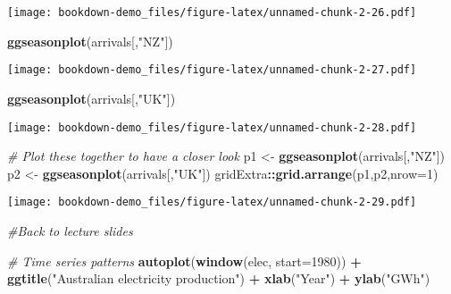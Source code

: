 \documentclass[]{book}
\newenvironment{Shaded}{\begin{snugshade}}{\end{snugshade}}
\newcommand{\CommentTok}[1]{\textcolor[rgb]{0.56,0.35,0.01}{\textit{#1}}}
\newcommand{\DataTypeTok}[1]{\textcolor[rgb]{0.13,0.29,0.53}{#1}}
\newcommand{\DecValTok}[1]{\textcolor[rgb]{0.00,0.00,0.81}{#1}}
\newcommand{\KeywordTok}[1]{\textcolor[rgb]{0.13,0.29,0.53}{\textbf{#1}}}
\newcommand{\NormalTok}[1]{#1}
\newcommand{\OperatorTok}[1]{\textcolor[rgb]{0.81,0.36,0.00}{\textbf{#1}}}
\newcommand{\StringTok}[1]{\textcolor[rgb]{0.31,0.60,0.02}{#1}}
\begin{document}
\texttt{[image: bookdown-demo\_files/figure-latex/unnamed-chunk-2-26.pdf]}

\begin{Shaded}
\begin{Highlighting}[]
  \KeywordTok{ggseasonplot}\NormalTok{(arrivals[,}\StringTok{"NZ"}\NormalTok{])}
\end{Highlighting}
\end{Shaded}

\texttt{[image: bookdown-demo\_files/figure-latex/unnamed-chunk-2-27.pdf]}

\begin{Shaded}
\begin{Highlighting}[]
  \KeywordTok{ggseasonplot}\NormalTok{(arrivals[,}\StringTok{"UK"}\NormalTok{])}
\end{Highlighting}
\end{Shaded}

\texttt{[image: bookdown-demo\_files/figure-latex/unnamed-chunk-2-28.pdf]}

\begin{Shaded}
\begin{Highlighting}[]
  \CommentTok{# Plot these together to have a closer look}
\NormalTok{  p1 <-}\StringTok{ }\KeywordTok{ggseasonplot}\NormalTok{(arrivals[,}\StringTok{"NZ"}\NormalTok{])}
\NormalTok{  p2 <-}\StringTok{ }\KeywordTok{ggseasonplot}\NormalTok{(arrivals[,}\StringTok{"UK"}\NormalTok{])}
\NormalTok{  gridExtra}\OperatorTok{::}\KeywordTok{grid.arrange}\NormalTok{(p1,p2,}\DataTypeTok{nrow=}\DecValTok{1}\NormalTok{)}
\end{Highlighting}
\end{Shaded}

\texttt{[image: bookdown-demo\_files/figure-latex/unnamed-chunk-2-29.pdf]}

\begin{Shaded}
\begin{Highlighting}[]
\CommentTok{#Back to lecture slides}

  \CommentTok{# Time series patterns}
  \KeywordTok{autoplot}\NormalTok{(}\KeywordTok{window}\NormalTok{(elec, }\DataTypeTok{start=}\DecValTok{1980}\NormalTok{)) }\OperatorTok{+}
\StringTok{    }\KeywordTok{ggtitle}\NormalTok{(}\StringTok{"Australian electricity production"}\NormalTok{) }\OperatorTok{+}
\StringTok{    }\KeywordTok{xlab}\NormalTok{(}\StringTok{"Year"}\NormalTok{) }\OperatorTok{+}\StringTok{ }\KeywordTok{ylab}\NormalTok{(}\StringTok{"GWh"}\NormalTok{)}
\end{Highlighting}
\end{Shaded}
\end{document}
